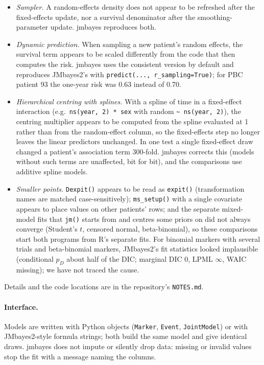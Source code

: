 \documentclass[11pt]{article}
\begin{document}
\begin{itemize}
\item \emph{Sampler.} A random-effects density does not appear to be refreshed after the
fixed-effects update, nor a survival denominator after the smoothing-parameter update.
jmbayes reproduces both.
\item \emph{Dynamic prediction.} When sampling a new patient's random effects, the survival
term appears to be scaled differently from the code that then computes the risk. jmbayes
uses the consistent version by default and reproduces JMbayes2's with
\texttt{predict(..., r\_sampling=True)}; for PBC patient 93 the one-year
risk was 0.63 instead of 0.70.
\item \emph{Hierarchical centring with splines.} With a spline of time in a fixed-effect
interaction (e.g.\ \texttt{ns(year, 2) * sex} with random \texttt{\textasciitilde{} ns(year, 2)}),
the centring multiplier appears to be computed from the spline evaluated at 1 rather than
from the random-effect column, so the fixed-effects step no longer leaves the linear
predictors unchanged. In one test a single fixed-effect draw changed a patient's
association term 300-fold. jmbayes corrects this (models without such terms are
unaffected, bit for bit), and the comparisons use additive spline models.
\item \emph{Smaller points.} \texttt{Dexpit()} appears to be read as \texttt{expit()}
(transformation names are matched case-sensitively); \texttt{ms\_setup()} with a single
covariate appears to place values on other patients' rows; and the separate mixed-model
fits that \texttt{jm()} starts from and centres some priors on did not always converge
(Student's $t$, censored normal, beta-binomial), so these comparisons start both programs
from R's separate fits. For binomial markers with several trials and beta-binomial markers,
JMbayes2's fit statistics looked implausible (conditional $p_D$ about half of the DIC;
marginal DIC 0, LPML $\infty$, WAIC missing); we have not traced the cause.
\end{itemize}
Details and the code locations are in the repository's \texttt{NOTES.md}.

\paragraph{Interface.} Models are written with Python objects
(\texttt{Marker}, \texttt{Event}, \texttt{JointModel}) or with JMbayes2-style formula
strings; both build the same model and give identical draws. jmbayes does not impute or
silently drop data: missing or invalid values stop the fit with a message naming the
columns.
\end{document}
